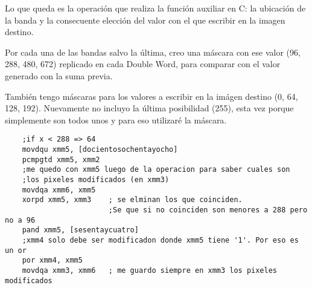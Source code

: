 Lo que queda es la operaci\'on que realiza la funci\'on auxiliar en C: la ubicaci\'on de la banda y la consecuente elecci\'on del valor con el que escribir en la imagen destino.

Por cada una de las bandas salvo la \'ultima, creo una m\'ascara con ese valor (96, 288, 480, 672) replicado en cada Double Word, para comparar con el valor generado con 
la suma previa.

Tambi\'en tengo m\'ascaras para los valores a escribir en la im\'agen destino (0, 64, 128, 192). Nuevamente no incluyo la \'ultima posibilidad (255), esta vez porque 
simplemente son todos unos y para eso utilizar\'e la m\'ascara.

\begin{codesnippet}
\begin{verbatim}
	;if x < 288 => 64
	movdqu xmm5, [docientosochentayocho]
	pcmpgtd xmm5, xmm2
	;me quedo con xmm5 luego de la operacion para saber cuales son 
	;los pixeles modificados (en xmm3)
	movdqa xmm6, xmm5
	xorpd xmm5, xmm3	; se elminan los que coinciden. 
						;Se que si no coinciden son menores a 288 pero no a 96
	pand xmm5, [sesentaycuatro]
	;xmm4 solo debe ser modificadon donde xmm5 tiene '1'. Por eso es un or
	por xmm4, xmm5
	movdqa xmm3, xmm6	; me guardo siempre en xmm3 los pixeles modificados
\end{verbatim}
\end{codesnippet}



